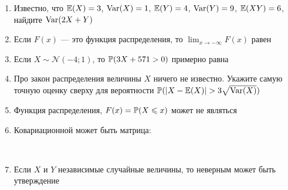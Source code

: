 \documentclass[12pt, a4paper]{article}\usepackage[]{graphicx}\usepackage[]{color}
\newcommand{\cN}{\mathcal{N}}
\begin{document}
\begin{enumerate}
\item Известно, что $\E(X)=3$, $\Var(X)=1$, $\E(Y)=4$, $\Var(Y)=9$, $\E(XY)=6$, найдите $\Var(2X+Y)$


\item Если $F(x)$ — это функция распределения, то $\lim_{x\to -\infty}F(x)$ равен


\item Если $X\sim \cN(-4;1)$, то $\P(3X+571>0)$ примерно равна


\item Про закон распределения величины $X$ ничего не известно. Укажите самую точную оценку сверху для вероятности $\P(|X-\E(X)|>3\sqrt{\Var(X)})$


\item Функция распределения, $F(x)=\P(X\leq x)$ может не являться


\item Ковариационной может быть матрица:

\\

\item Если $X$ и $Y$ независимые случайные величины, то неверным может быть утверждение


\end{enumerate}
\end{document}
